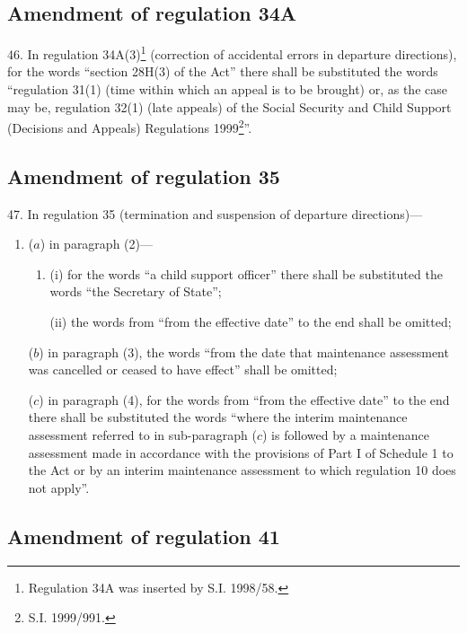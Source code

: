 \documentclass[12pt,a4paper]{article}
\begin{document}
\subsection[46. Amendment of regulation 34A]{Amendment of regulation 34A}

46.  In regulation 34A(3)\footnote{\frenchspacing Regulation 34A was inserted by S.I. 1998/58.} (correction of accidental errors in departure directions), for the words “section 28H(3) of the Act” there shall be substituted the words “regulation 31(1) (time within which an appeal is to be brought) or, as the case may be, regulation 32(1) (late appeals) of the Social Security and Child Support (Decisions and Appeals) Regulations 1999\footnote{\frenchspacing S.I. 1999/991.}”.

\subsection[47. Amendment of regulation 35]{Amendment of regulation 35}

47.  In regulation 35 (termination and suspension of departure directions)---
\begin{enumerate}\item[]
($a$) in paragraph (2)---
\begin{enumerate}\item[]
(i) for the words “a child support officer” there shall be substituted the words “the Secretary of State”;

(ii) the words from “from the effective date” to the end shall be omitted;
\end{enumerate}

($b$) in paragraph (3), the words “from the date that maintenance assessment was cancelled or ceased to have effect” shall be omitted;

($c$) in paragraph (4), for the words from “from the effective date” to the end there shall be substituted the words “where the interim maintenance assessment referred to in sub-paragraph ($c$) is followed by a maintenance assessment made in accordance with the provisions of Part I of Schedule 1 to the Act or by an interim maintenance assessment to which regulation 10 does not apply”.
\end{enumerate}

\subsection[48. Amendment of regulation 41]{Amendment of regulation 41}
\end{document}
